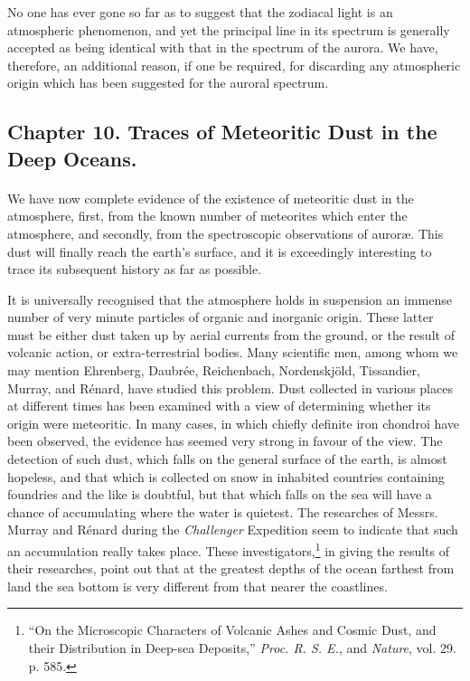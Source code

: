 \documentclass[a4paper, 12pt, oneside, polutonikogreek, english]{article}
\begin{document}
No one has ever gone so far as to suggest that the zodiacal light is an atmospheric phenomenon, and yet the principal line in its spectrum is generally accepted as being identical with that in the spectrum of the aurora. We have, therefore, an additional reason, if one be required, for discarding any atmospheric origin which has been suggested for the auroral spectrum.
\clearpage
\subsection{Chapter 10. Traces of Meteoritic Dust in the Deep Oceans.}
\paragraph{}
We have now complete evidence of the existence of meteoritic dust in the atmosphere, first, from the known number of meteorites which enter the atmosphere, and secondly, from the spectroscopic observations of auroræ. This dust will finally reach the earth's surface, and it is exceedingly interesting to trace its subsequent history as far as possible.

It is universally recognised that the atmosphere holds in suspension an immense number of very minute particles of organic and inorganic origin. These latter must be either dust taken up by aerial currents from the ground, or the result of volcanic action, or extra-terrestrial bodies. Many scientific men, among whom we may mention Ehrenberg, Daubrée, Reichenbach, Nordenskjöld, Tissandier, Murray, and Rénard, have studied this problem. Dust collected in various places at different times has been examined with a view of determining whether its origin were meteoritic. In many cases, in which chiefly definite iron chondroi have been observed, the evidence has seemed very strong in favour of the view. The detection of such dust, which falls on the general surface of the earth, is almost hopeless, and that which is collected on snow in inhabited countries containing foundries and the like is doubtful, but that which falls on the sea will have a chance of accumulating where the water is quietest. The researches of Messrs. Murray and Rénard during the \emph{Challenger} Expedition seem to indicate that such an accumulation really takes place. These investigators,\footnote{``On the Microscopic Characters of Volcanic Ashes and Cosmic Dust, and their Distribution in Deep-sea Deposits,'' \emph{Proc. R. S. E.}, and \emph{Nature}, vol. 29. p. 585.} in giving the results of their researches, point out that at the greatest depths of the ocean farthest from land the sea bottom is very different from that nearer the coastlines.
\end{document}
